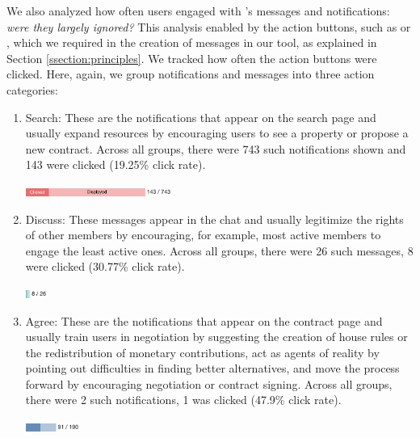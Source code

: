 We also analyzed how often users engaged with \cbot's messages and notifications: \textit{were they largely ignored?} This analysis enabled by the action buttons, such as  or , which we required in the creation of messages in our tool, as explained in Section \ref{ssection:principles}. We tracked how often the action buttons were clicked. Here, again, we group notifications and messages into three action categories: 

\begin{enumerate}
    \item Search: These are the notifications that appear on the search page and usually expand resources by encouraging users to see a property or propose a new contract.
    Across all groups, there were 743 such notifications shown and 143 were clicked (19.25\% click rate).
    
    \vspace{0.1cm}\includegraphics[height=10px]{images/clicks/search-with-label.pdf}
    
    \item Discuss: These messages appear in the chat and usually legitimize the rights of other members by encouraging, for example, most active members to engage the least active ones. Across all groups, there were 26 such messages, 8 were clicked (30.77\% click rate).

    \vspace{0.1cm}\includegraphics[height=10px]{images/clicks/discuss-with-label.pdf}
    
    \item Agree: These are the notifications that appear on the contract page and usually train users in negotiation by suggesting the creation of house rules or the redistribution of monetary contributions, act as agents of reality by pointing out difficulties in finding better alternatives, and move the process forward by encouraging negotiation or contract signing. Across all groups, there were 2 such notifications, 1 was clicked (47.9\% click rate).

    \vspace{0.1cm}\includegraphics[height=10px]{images/clicks/agree-with-label.pdf}
\end{enumerate}

